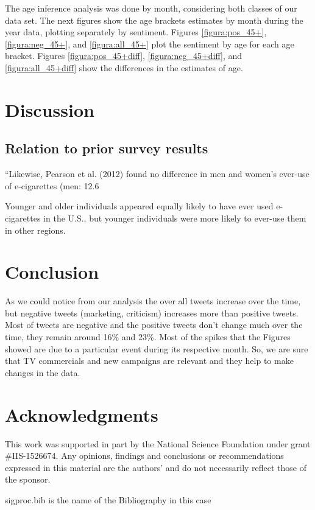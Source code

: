\documentclass{sig-alternate}
\begin{document}
The age inference analysis was done by month, considering both classes of our data set. The next figures show the age brackets estimates by month during the year data, plotting separately by sentiment. Figures \ref{figura:pos_45+}, \ref{figura:neg_45+}, and \ref{figura:all_45+} plot the sentiment by age for each age bracket. Figures \ref{figura:pos_45+diff}, \ref{figura:neg_45+diff}, and \ref{figura:all_45+diff} show the differences in the estimates of age. 

\section{Discussion}
\label{s.discussion}

\subsection{Relation to prior survey results}
``Likewise, Pearson et al. (2012) found no difference in men and women's ever-use of e-cigarettes (men: 12.6%

Younger and older individuals appeared equally likely to have ever used e-cigarettes in the U.S., but younger individuals were more likely to ever-use them in other regions. 



\section{Conclusion}
\label{s.conclusion}

As we could notice from our analysis the over all tweets increase over the time, but negative tweets (marketing, criticism) increases more than positive tweets. Most of tweets are negative and the positive tweets don't change much over the time, they remain around 16\% and 23\%. Most of the spikes that the Figures showed are due to a particular event during its respective month. So, we are sure that TV commercials and new campaigns are relevant and they help to make changes in the data.

\section{Acknowledgments}
This work was supported in part by the National Science Foundation under grant
\#IIS-1526674.  Any opinions, findings and conclusions or recommendations
expressed in this material are the authors' and do not necessarily reflect
those of the sponsor.

sigproc.bib is the name of the Bibliography in this case
%
%
\end{document}
